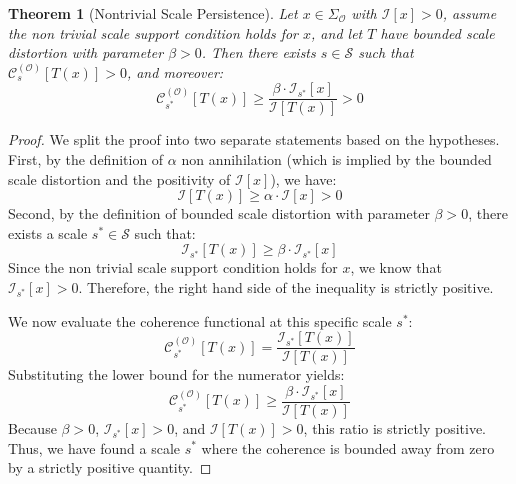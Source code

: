 \documentclass[12pt]{article}
\newtheorem{theorem}{Theorem}
\theoremstyle{definition}
\begin{document}
\begin{theorem}[Nontrivial Scale Persistence]
Let $x \in \Sigma_{\mathcal{O}}$ with $\mathcal{I}[x] > 0$, assume the non trivial scale support condition holds for $x$, and let $T$ have bounded scale distortion with parameter $\beta > 0$. Then there exists $s \in \mathcal{S}$ such that $\mathcal{C}_s^{(\mathcal{O})}[T(x)] > 0$, and moreover:
\begin{equation}
\mathcal{C}_{s^*}^{(\mathcal{O})}[T(x)] \geq \frac{\beta \cdot \mathcal{I}_{s^*}[x]}{\mathcal{I}[T(x)]} > 0
\end{equation}
\end{theorem}
\begin{proof}
We split the proof into two separate statements based on the hypotheses. First, by the definition of $\alpha$ non annihilation (which is implied by the bounded scale distortion and the positivity of $\mathcal{I}[x]$), we have:
\begin{equation}
\mathcal{I}[T(x)] \geq \alpha \cdot \mathcal{I}[x] > 0
\end{equation}
Second, by the definition of bounded scale distortion with parameter $\beta > 0$, there exists a scale $s^* \in \mathcal{S}$ such that:
\begin{equation}
\mathcal{I}_{s^*}[T(x)] \geq \beta \cdot \mathcal{I}_{s^*}[x]
\end{equation}
Since the non trivial scale support condition holds for $x$, we know that $\mathcal{I}_{s^*}[x] > 0$. Therefore, the right hand side of the inequality is strictly positive. 

We now evaluate the coherence functional at this specific scale $s^*$:
\begin{equation}
\mathcal{C}_{s^*}^{(\mathcal{O})}[T(x)] = \frac{\mathcal{I}_{s^*}[T(x)]}{\mathcal{I}[T(x)]}
\end{equation}
Substituting the lower bound for the numerator yields:
\begin{equation}
\mathcal{C}_{s^*}^{(\mathcal{O})}[T(x)] \geq \frac{\beta \cdot \mathcal{I}_{s^*}[x]}{\mathcal{I}[T(x)]}
\end{equation}
Because $\beta > 0$, $\mathcal{I}_{s^*}[x] > 0$, and $\mathcal{I}[T(x)] > 0$, this ratio is strictly positive. Thus, we have found a scale $s^*$ where the coherence is bounded away from zero by a strictly positive quantity.
\end{proof}
\end{document}
